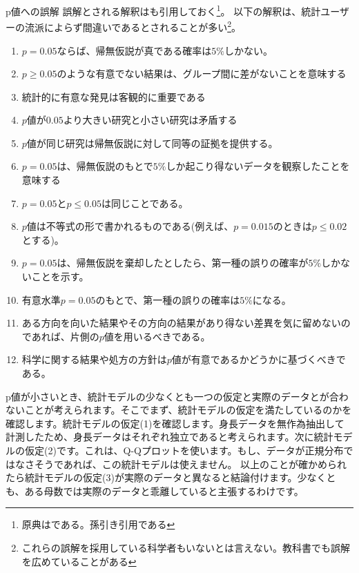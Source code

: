 \begin{SMbox}{p値への誤解}
    誤解とされる解釈はも引用しておく\cite{idiot_statistics2014}\footnote{原典は\cite{GOODMAN2008135}である。孫引き引用である}。
    以下の解釈は、統計ユーザーの流派によらず間違いであるとされることが多い\footnote{これらの誤解を採用している科学者もいないとは言えない。教科書でも誤解を広めていることがある}。
    \begin{enumerate}
        \item $p=0.05$ならば、帰無仮説が真である確率は$5\%$しかない。
        \item $p\geq 0.05$のような有意でない結果は、グループ間に差がないことを意味する
        \item 統計的に有意な発見は客観的に重要である
        \item $p$値が$0.05$より大きい研究と小さい研究は矛盾する
        \item $p$値が同じ研究は帰無仮説に対して同等の証拠を提供する。
        \item $p=0.05$は、帰無仮説のもとで$5\%$しか起こり得ないデータを観察したことを意味する
        \item $p=0.05$と$p\leq 0.05$は同じことである。
        \item $p$値は不等式の形で書かれるものである(例えば、$p=0.015$のときは$p\leq 0.02$とする)。
        \item $p=0.05$は、帰無仮説を棄却したとしたら、第一種の誤りの確率が$5\%$しかないことを示す。
        \item 有意水準$p=0.05$のもとで、第一種の誤りの確率は$5\%$になる。
        \item ある方向を向いた結果やその方向の結果があり得ない差異を気に留めないのであれば、片側の$p$値を用いるべきである。
        \item 科学に関する結果や処方の方針は$p$値が有意であるかどうかに基づくべきである。
    \end{enumerate}
\end{SMbox}




p値が小さいとき、統計モデルの少なくとも一つの仮定と実際のデータとが合わないことが考えられます。そこでまず、統計モデルの仮定を満たしているのかを確認します。統計モデルの仮定(1)を確認します。身長データを無作為抽出して計測したため、身長データはそれぞれ独立であると考えられます。次に統計モデルの仮定(2)です。これは、Q-Qプロットを使います。もし、データが正規分布ではなさそうであれば、この統計モデルは使えません。
以上のことが確かめられたら統計モデルの仮定(3)が実際のデータと異なると結論付けます。少なくとも、ある母数では実際のデータと乖離していると主張するわけです。
\fi

